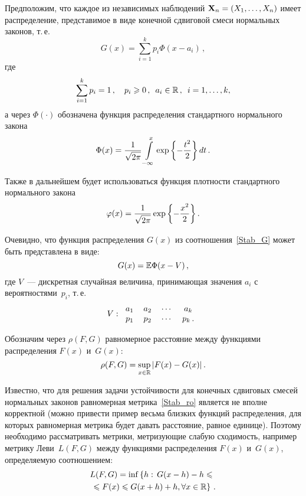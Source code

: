 \begin{multicols}{2}
Предположим, что каждое из независимых наблюдений
$\mathbf{X}_n\hm=(X_1,\ldots,X_n)$ имеет распределение,
представимое в виде конечной сдвиговой смеси нормальных законов,
т.\,е.\
\begin{equation}
\label{Stab_G} 
G(x)=\sum\limits_{i=1}^k p_i\Phi(x-a_i)\,,
\end{equation}
где
\begin{equation*}
\sum\limits_{i=1}^{k}p_i=1\,,\quad p_i\geqslant0\,,\enskip a_i\in\mathbb R\,,\enskip  i=1,\ldots,k,
\end{equation*}
а через $\Phi(\cdot)$ обозначена функция распределения
стандартного нормального закона
\begin{equation*}
\Phi(x)=\displaystyle\frac{\displaystyle 1\mathstrut}{\displaystyle \sqrt{2\pi}\mathstrut}\int\limits_{-\infty}^x\exp{\left\{
-\displaystyle\frac{\displaystyle t^2\mathstrut}{\displaystyle 2\mathstrut}\right\}}\,dt\,.
\end{equation*}

Также в дальнейшем будет использоваться функция плотности
стандартного нормального закона
$$
\varphi(x)=\displaystyle\frac{\displaystyle 1\mathstrut}{\displaystyle \sqrt{2\pi}\mathstrut}\exp{\left\{ -\displaystyle\frac{\displaystyle x^2\mathstrut}{\displaystyle 2\mathstrut}\right\}}\,.
$$

Очевидно, что функция распределения $G(x)$ из
соотношения~\eqref{Stab_G} может быть представлена в виде:
$$
G(x)=\mathbb E\Phi(x-V)\,,
$$
где $V$~--- дискретная случайная величина, принимающая значения
$a_i$ с вероятностями~$p_i$, т.\,е.\
\begin{equation}
\label{Stab_V} V:
\begin{tabular}{cccc}
$a_1$&$a_2$&$\cdots$&$a_k$\\
$p_1$&$p_2$&$\cdots$&$p_k$\,.
\end{tabular}
\end{equation}

Обозначим  через $\rho(F,G)$ равномерное расстояние между
функциями распределения $F(x)$ и~$G(x)$:
\begin{equation}
\label{Stab_ro}
\rho(F,G)=\sup\limits_{x\in\mathbb R}|F(x)-G(x)|\,.
\end{equation}

Известно, что для решения задачи устойчивости для конечных
сдвиговых смесей нормальных законов равномерная
метрика~\eqref{Stab_ro} является не вполне корректной (можно привести
пример весьма близких функций распределения, для которых
равномерная метрика будет давать расстояние, равное единице). Поэтому
необходимо рассматривать мет\-ри\-ки, метризующие слабую сходимость,
например метрику Леви~$L(F,G)$ между функциями распределения
$F(x)$ и~$G(x)$, определяемую соотношением:
\begin{multline*}
L(F,G)=\inf\left\{h:\, G(x-h)-h\leqslant{}\right.\\
\left.{}\leqslant F(x)\leqslant G(x+h)+h,
\forall x\in\mathbb R\right\}\,.
\end{multline*}


\end{multicols}
